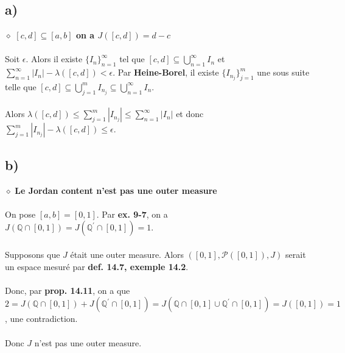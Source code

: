 \documentclass[a4paper,10pt]{article}
\begin{document}
\subsection*{a)}
$\diamond$ \textbf{$[c,d] \subseteq [a,b]$ on a $J([c,d]) = d-c $}
\\
\\
Soit $\epsilon$. Alors il existe $\{I_n\}_{n=1}^\infty$ tel que $[c,d] \subseteq \bigcup_{n=1}^\infty I_n$ et $\sum_{n=1}^\infty |I_n| - \lambda([c,d]) < \epsilon$. Par \textbf{Heine-Borel}, il existe $\{I_{n_j}\}_{j=1}^m$ une sous suite telle que $[c,d] \subseteq \bigcup_{j=1}^m I_{n_j} \subseteq \bigcup_{n=1}^\infty I_n$.
\\
\\
Alors $\lambda([c,d]) \leq \sum_{j=1}^m |I_{n_j}| \leq \sum_{n=1}^\infty |I_n|$ et donc $\sum_{j=1}^m |I_{n_j}| - \lambda ([c,d]) \leq \epsilon$. 

\subsection*{b)}
$\diamond$ \textbf{Le Jordan content n'est pas une outer measure}
\\
\\
On pose $[a,b] = [0,1]$. Par \textbf{ex. 9-7}, on a $J(\mathbb{Q} \cap [0,1]) = J(\mathbb{Q}^\prime \cap [0,1]) = 1$. 
\\
\\
Supposons que $J$ était une outer measure. Alors $([0,1], \mathcal{P}([0,1]), J)$ serait un espace mesuré par \textbf{def. 14.7, exemple 14.2}.
\\
\\
Donc, par \textbf{prop. 14.11}, on a que $2 = J(\mathbb{Q} \cap [0,1]) + J (\mathbb{Q}^\prime \cap [0,1]) = J(\mathbb{Q} \cap [0,1] \cup \mathbb{Q}^\prime \cap [0,1]) = J ([0,1]) = 1$, une contradiction. 
\\
\\
Donc $J$ n'est pas une outer measure.
\end{document}
